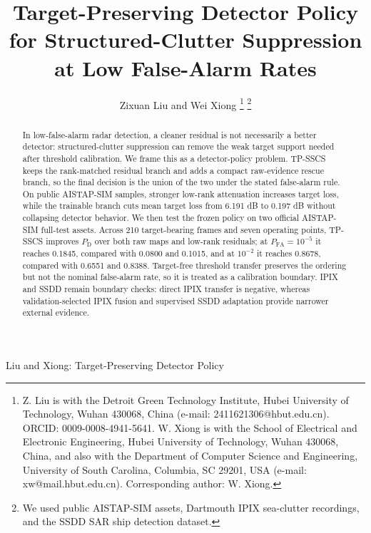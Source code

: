 \documentclass[journal]{IEEEtran}
\begin{document}
\title{Target-Preserving Detector Policy for Structured-Clutter Suppression at Low False-Alarm Rates}

\author{Zixuan Liu and Wei Xiong%
\thanks{Z. Liu is with the Detroit Green Technology Institute, Hubei University of Technology, Wuhan 430068, China (e-mail: 2411621306@hbut.edu.cn). ORCID: 0009-0008-4941-5641. W. Xiong is with the School of Electrical and Electronic Engineering, Hubei University of Technology, Wuhan 430068, China, and also with the Department of Computer Science and Engineering, University of South Carolina, Columbia, SC 29201, USA (e-mail: xw@mail.hbut.edu.cn). Corresponding author: W. Xiong.}%
\thanks{We used public AISTAP-SIM assets, Dartmouth IPIX sea-clutter recordings, and the SSDD SAR ship detection dataset.}}

%
{Liu and Xiong: Target-Preserving Detector Policy}

\maketitle
\linespread{0.96}\selectfont

\begin{abstract}
In low-false-alarm radar detection, a cleaner residual is not necessarily a better detector: structured-clutter suppression can remove the weak target support needed after threshold calibration. We frame this as a detector-policy problem. TP-SSCS keeps the rank-matched residual branch and adds a compact raw-evidence rescue branch, so the final decision is the union of the two under the stated false-alarm rule. On public AISTAP-SIM samples, stronger low-rank attenuation increases target loss, while the trainable branch cuts mean target loss from 6.191 dB to 0.197 dB without collapsing detector behavior. We then test the frozen policy on two official AISTAP-SIM full-test assets. Across 210 target-bearing frames and seven operating points, TP-SSCS improves $P_{\mathrm{D}}$ over both raw maps and low-rank residuals; at $P_{\mathrm{FA}}=10^{-5}$ it reaches 0.1845, compared with 0.0800 and 0.1015, and at $10^{-2}$ it reaches 0.8678, compared with 0.6551 and 0.8388. Target-free threshold transfer preserves the ordering but not the nominal false-alarm rate, so it is treated as a calibration boundary. IPIX and SSDD remain boundary checks: direct IPIX transfer is negative, whereas validation-selected IPIX fusion and supervised SSDD adaptation provide narrower external evidence.
\end{abstract}
\end{document}
